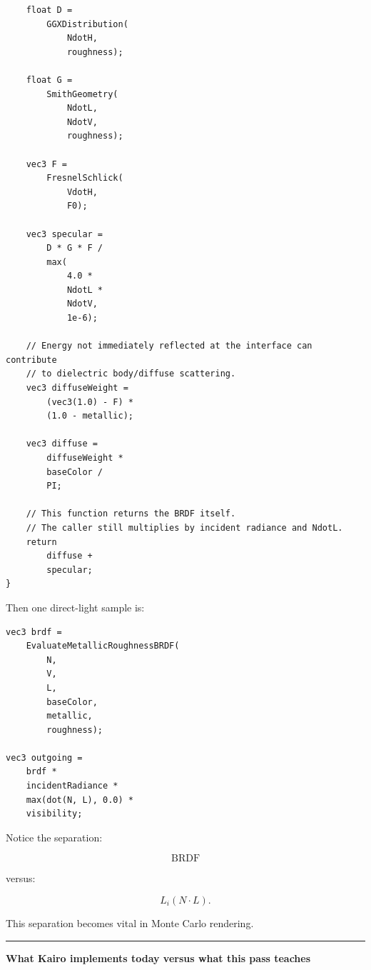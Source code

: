 \begin{verbatim}
    float D =
        GGXDistribution(
            NdotH,
            roughness);

    float G =
        SmithGeometry(
            NdotL,
            NdotV,
            roughness);

    vec3 F =
        FresnelSchlick(
            VdotH,
            F0);

    vec3 specular =
        D * G * F /
        max(
            4.0 *
            NdotL *
            NdotV,
            1e-6);

    // Energy not immediately reflected at the interface can contribute
    // to dielectric body/diffuse scattering.
    vec3 diffuseWeight =
        (vec3(1.0) - F) *
        (1.0 - metallic);

    vec3 diffuse =
        diffuseWeight *
        baseColor /
        PI;

    // This function returns the BRDF itself.
    // The caller still multiplies by incident radiance and NdotL.
    return
        diffuse +
        specular;
}
\end{verbatim}

Then one direct-light sample is:

\begin{verbatim}
vec3 brdf =
    EvaluateMetallicRoughnessBRDF(
        N,
        V,
        L,
        baseColor,
        metallic,
        roughness);

vec3 outgoing =
    brdf *
    incidentRadiance *
    max(dot(N, L), 0.0) *
    visibility;
\end{verbatim}

Notice the separation:

\[
\boxed{
\text{BRDF}
}
\]

versus:

\[
\boxed{
L_i(N\cdot L).
}
\]

This separation becomes vital in Monte Carlo rendering.

\begin{center}\rule{0.5\linewidth}{0.5pt}\end{center}

\textbf{What Kairo implements today versus what this pass teaches}


